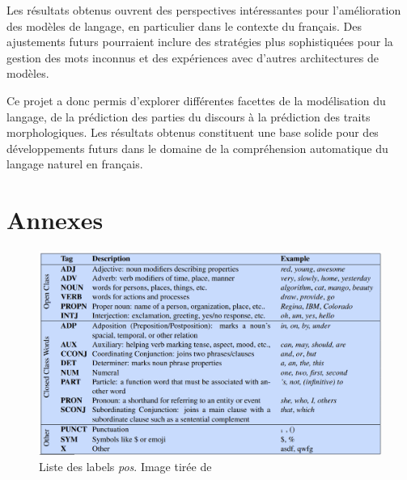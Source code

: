 \documentclass[a4paper]{article}
\begin{document}
Les résultats obtenus ouvrent des perspectives intéressantes pour l'amélioration des modèles de langage, en particulier dans le contexte du français. Des ajustements futurs pourraient inclure des stratégies plus sophistiquées pour la gestion des mots inconnus et des expériences avec d'autres architectures de modèles.

Ce projet a donc permis d'explorer différentes facettes de la modélisation du langage, de la prédiction des parties du discours à la prédiction des traits morphologiques. Les résultats obtenus constituent une base solide pour des développements futurs dans le domaine de la compréhension automatique du langage naturel en français.

\section{Annexes}
\label{sec: Annexes}

\begin{figure}[H]
    \centering
    \includegraphics[width=\textwidth]{all_pos.png}
    \caption{Liste des labels \textit{pos}. Image tirée de~\cite{pos}}
\end{figure}   

\newpage

\printbibliography
\end{document}
